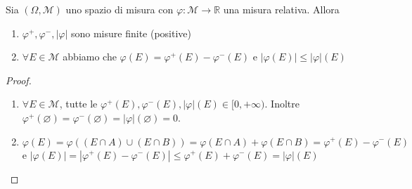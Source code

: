 \begin{theorem}\label{thm:misure-relative-osservazioni}
    Sia \((\Omega, \mathcal{M})\) uno spazio di misura con \(\varphi:
    \mathcal{M} \to \mathbb{R}\) una misura relativa. Allora 
\begin{enumerate}[label = \arabic*)]
    \item \(\varphi^{+}, \varphi^{-}, |\varphi|\) sono misure finite (positive)
    \item \(\forall E \in \mathcal{M}\) abbiamo che 
        \(
            \varphi(E) = \varphi^{+}(E) - \varphi^{-}(E)
        \)
        e 
        \(
            |\varphi(E)| \le |\varphi|(E)
       \)
\end{enumerate}
\end{theorem}
\begin{proof}
\begin{enumerate}[label = \arabic*.]
    \item \(\forall E \in \mathcal{M}\), tutte le \(\varphi^{+}(E), \varphi^{-}(E),
        |\varphi|(E) \in [0, +\infty)\). Inoltre \(\varphi^{+}(\varnothing) =
        \varphi^{-}(\varnothing) = |\varphi|(\varnothing) = 0\).
    \item \(\varphi(E) = \varphi((E \cap A) \cup (E \cap B)) = \varphi(E \cap A)
        + \varphi(E \cap B) = \varphi^{+}(E) - \varphi^{-}(E)\) e \(|\varphi(E)|
        = |\varphi^{+}(E) - \varphi^{-}(E)| \le \varphi^{+}(E) + \varphi^{-}(E)
        = |\varphi|(E)\) 
\end{enumerate}
\end{proof}


